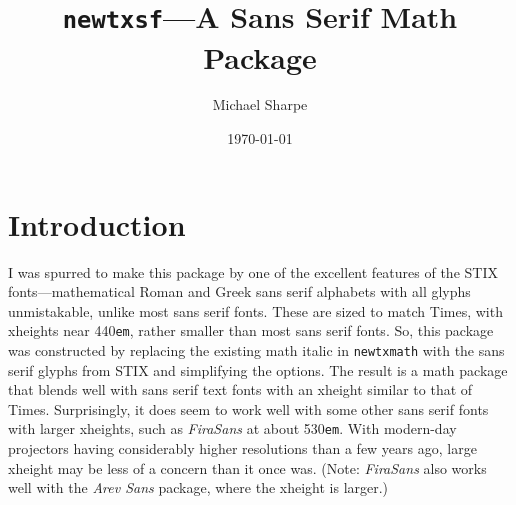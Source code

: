 \documentclass[11pt]{article}
\title{\protect\texttt{newtxsf}---A Sans Serif Math Package}
\author{Michael Sharpe}
\date{\today}  %
\begin{document}
\maketitle
\section{Introduction}
I was spurred to make this package by one of the excellent features of the STIX fonts---mathematical Roman and Greek sans serif alphabets with all glyphs unmistakable, unlike most sans serif fonts. These are sized to match Times, with xheights near 440{\tt em}, rather smaller than most sans serif fonts. So, this package was constructed by replacing the existing math italic in {\tt newtxmath} with the sans serif glyphs from STIX and simplifying the options.  The result is a math package that blends well with sans serif text fonts with an xheight similar to that of  Times. Surprisingly, it does seem to work well with some other sans serif fonts with larger xheights, such as \emph{FiraSans} at about 530{\tt em}. With modern-day projectors having considerably higher resolutions than a few years ago, large xheight may be less of a concern than it once was. (Note: \emph{FiraSans} also works well with the \emph{Arev Sans} package, where the xheight is larger.)
\end{document}
